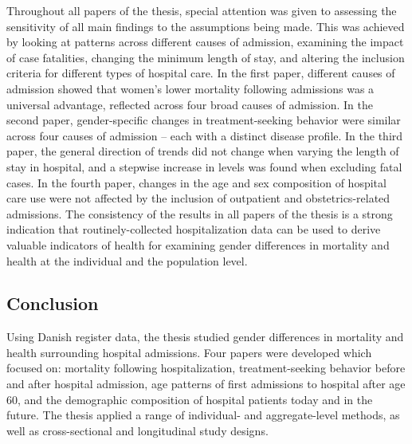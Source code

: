 Throughout all papers of the thesis, special attention was given 
to assessing the sensitivity of all main findings to the 
assumptions being made. This was achieved by looking at patterns 
across different causes of admission, examining the impact of 
case fatalities, changing the minimum length of stay, and altering 
the inclusion criteria for different types of hospital care. In the 
first paper, different causes of admission showed that women's lower 
mortality following admissions was a universal advantage, reflected 
across four broad causes of admission. In the second paper, 
gender-specific changes in treatment-seeking behavior were similar 
across four causes of admission -- each with a distinct disease 
profile. In the third paper, the general direction of trends 
did not change when varying the length of stay in hospital, 
and a stepwise increase in levels was found when excluding 
fatal cases. In the fourth paper, changes in the age and sex 
composition of hospital care use were not affected by the 
inclusion of outpatient and obstetrics-related admissions. 
The consistency of the results in all papers of the thesis 
is a strong indication that routinely-collected hospitalization 
data can be used to derive valuable indicators of health for 
examining gender differences in mortality and health 
at the individual and the population level. \\




\subsection{Conclusion}

Using Danish register data, the thesis studied gender differences 
in mortality and health surrounding hospital admissions. Four papers 
were developed which focused on: mortality following hospitalization, 
treatment-seeking behavior before and after hospital admission, age 
patterns of first admissions to hospital after age 60, and the 
demographic composition of hospital patients today and in the 
future. The thesis applied a range of individual- and aggregate-level 
methods, as well as cross-sectional and longitudinal study designs.

